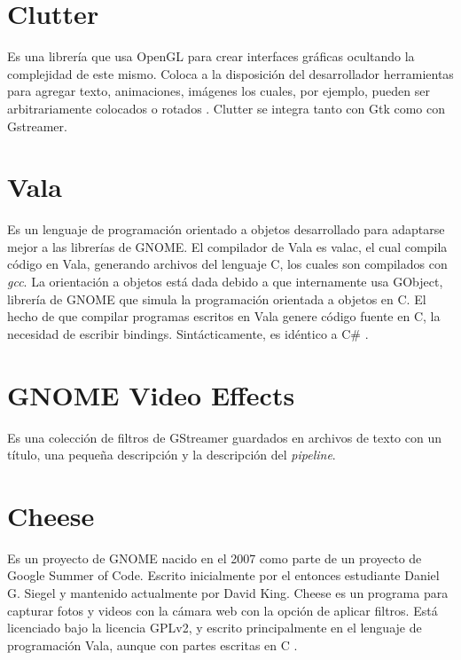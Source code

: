 \documentclass[a4paper,openright,12pt]{report}
\begin{document}
\section{Clutter}
Es una librería que usa OpenGL para crear interfaces gráficas ocultando la
complejidad de este mismo. Coloca a la disposición del desarrollador
herramientas para agregar texto, animaciones, imágenes los cuales, por ejemplo,
pueden ser arbitrariamente colocados o rotados \cite{clutterOverview}. Clutter
se integra tanto con Gtk como con Gstreamer.
\section{Vala}
Es un lenguaje de programación orientado a objetos desarrollado para adaptarse
mejor a las librerías de GNOME. El compilador de Vala es valac, el cual compila
código en Vala, generando archivos del lenguaje C, los cuales son compilados con
\textit{gcc}. La orientación a objetos está dada debido a que internamente usa
GObject, librería de GNOME que simula la programación orientada a objetos en C.
El hecho de que compilar programas escritos en Vala genere código fuente en C,
la necesidad de escribir bindings. Sintácticamente, es idéntico a C\#
\cite{valaOverview}.
\section{GNOME Video Effects}
Es una colección de filtros de GStreamer \cite{GNOMEVideoEffects} guardados en
archivos de texto con un título, una pequeña descripción y la descripción del
\textit{pipeline}.
\section{Cheese}
Es un proyecto de GNOME nacido en el 2007 como parte de un proyecto de Google
Summer of Code. Escrito inicialmente por el entonces estudiante Daniel G. Siegel
y mantenido actualmente por David King. Cheese es un programa para capturar
fotos y videos con la cámara web con la opción de aplicar filtros. Está
licenciado bajo la licencia GPLv2, y escrito principalmente en el lenguaje de
programación Vala, aunque con partes escritas en C \cite{cheeseReferenceManual}
\cite{cheeseApp}.\\
\end{document}
